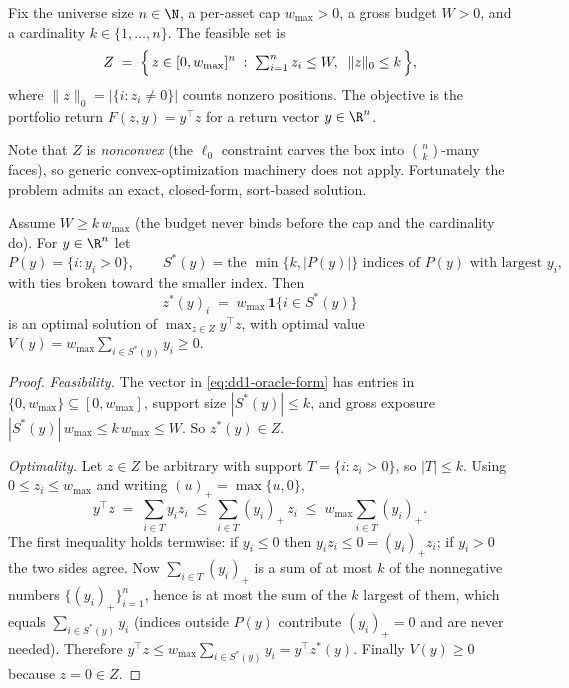\begin{definition}
\label{def:dd1-portfolio}
Fix the universe size $n \in \N$, a per-asset cap $w_{\max} > 0$, a gross
budget $W > 0$, and a cardinality $k \in \{1, \dots, n\}$. The feasible set is
\begin{equation}
\label{eq:dd1-Z}
Z \;=\; \Bigl\{\, z \in [0, w_{\max}]^n \;:\; \textstyle\sum_{i=1}^n z_i \le W,
\;\; \|z\|_0 \le k \,\Bigr\},
\end{equation}
where $\|z\|_0 = |\{i : z_i \neq 0\}|$ counts nonzero positions. The objective
is the portfolio return $F(z, y) = y^\top z$ for a return vector $y \in \R^n$.
\end{definition}

Note that $Z$ is \emph{nonconvex} (the $\ell_0$ constraint carves the box into
$\binom{n}{k}$-many faces), so generic convex-optimization machinery does not
apply. Fortunately the problem admits an exact, closed-form, sort-based
solution.

\begin{theorem}
\label{thm:dd1-oracle}
Assume $W \ge k\, w_{\max}$ (the budget never binds before the cap and the
cardinality do). For $y \in \R^n$ let
\[
P(y) = \{ i : y_i > 0 \}, \qquad
S^*(y) = \text{the } \min\{k, |P(y)|\} \text{ indices of } P(y) \text{ with
largest } y_i,
\]
with ties broken toward the smaller index. Then
\begin{equation}
\label{eq:dd1-oracle-form}
z^*(y)_i \;=\; w_{\max} \,\mathbf{1}\{ i \in S^*(y) \}
\end{equation}
is an optimal solution of $\max_{z \in Z} y^\top z$, with optimal value
$V(y) = w_{\max} \sum_{i \in S^*(y)} y_i \ge 0$.
\end{theorem}

\begin{proof}
\emph{Feasibility.} The vector in \eqref{eq:dd1-oracle-form} has entries in
$\{0, w_{\max}\} \subseteq [0, w_{\max}]$, support size $|S^*(y)| \le k$, and
gross exposure $|S^*(y)|\, w_{\max} \le k\, w_{\max} \le W$. So
$z^*(y) \in Z$.

\emph{Optimality.} Let $z \in Z$ be arbitrary with support
$T = \{i : z_i > 0\}$, so $|T| \le k$. Using $0 \le z_i \le w_{\max}$ and
writing $(u)_+ = \max\{u, 0\}$,
\[
y^\top z \;=\; \sum_{i \in T} y_i z_i
\;\le\; \sum_{i \in T} (y_i)_+ \, z_i
\;\le\; w_{\max} \sum_{i \in T} (y_i)_+ .
\]
The first inequality holds termwise: if $y_i \le 0$ then $y_i z_i \le 0 =
(y_i)_+ z_i$; if $y_i > 0$ the two sides agree. Now
$\sum_{i \in T} (y_i)_+$ is a sum of at most $k$ of the nonnegative numbers
$\{(y_i)_+\}_{i=1}^n$, hence is at most the sum of the $k$ largest of them,
which equals $\sum_{i \in S^*(y)} y_i$ (indices outside $P(y)$ contribute
$(y_i)_+ = 0$ and are never needed). Therefore
$y^\top z \le w_{\max} \sum_{i \in S^*(y)} y_i = y^\top z^*(y)$. Finally
$V(y) \ge 0$ because $z = 0 \in Z$.
\end{proof}

